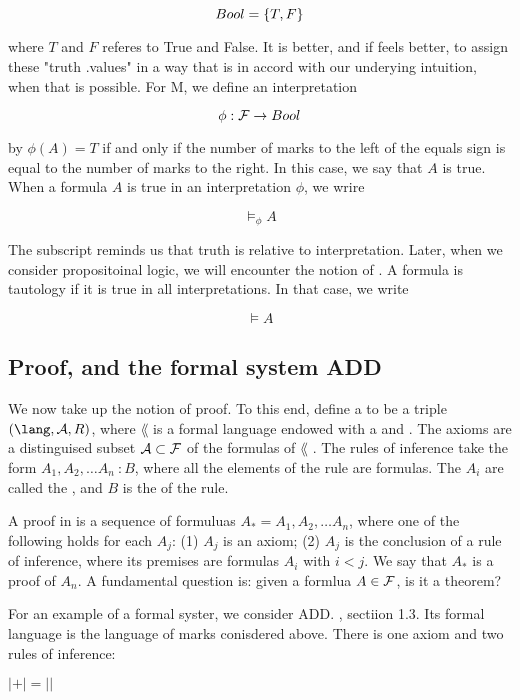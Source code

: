 $$
  Bool = \{ T, F \}
$$

where $T$ and $F$ referes to True and False.  It is better, and if feels better, to assign these "truth .values" in a way that is in accord with our underying intuition, when that is possible.  For M, we define an interpretation

$$
\phi : \mathcal{F} \to Bool
$$

by $\phi(A) = T$ if and only if the number of marks to the left of the equals sign is equal to the number of marks to the right.  In this case, we say that $A$ is true.
When a formula $A$ is true in an interpretation $\phi$, we wrire

$$
\models_{\phi} A
$$

The subscript reminds us that truth is relative to interpretation.  Later, when we consider propositoinal logic, we will encounter the notion of .  A formula is tautology if it is true in all interpretations.  In that case, we  write

$$
\models A
$$




\subsection{Proof, and the formal system ADD}

We now take up the notion of proof.  To this end, define
 a    to be a triple
$(\lang, \axioms, R)$, where $\lang$ is a formal language endowed with a  and .  The axioms are a distinguised subset  $\mathcal{A} \subset \mathcal{F}$ of the formulas of $\lang$ . The rules of inference take the form  $A_1, A_2, \ldots A_n\ : B$, where all the elements of the rule are formulas. The $A_i$  are called the , and $B$ is the  of the rule.

  A proof in  is a sequence of formuluas $A_* = A_1, A_2, \ldots A_n$, where one of the following holds for each $A_j$: (1) $A_j$ is an axiom; (2) $A_j$ is the conclusion of a rule of inference, where its premises are formulas $A_i$ with $i < j$.  We say that $A_*$ is a proof of $A_n$.  A fundamental question is: given a formlua $A \in \mathcal{F}$, is it a theorem?

For an example of a formal syster, we consider ADD. \cite{RH}, sectiion 1.3. Its formal language is the language of marks conisdered above.  There is one axiom and two rules of inference:

\begin{indent}
 $| + | = ||$
\end{indent}

